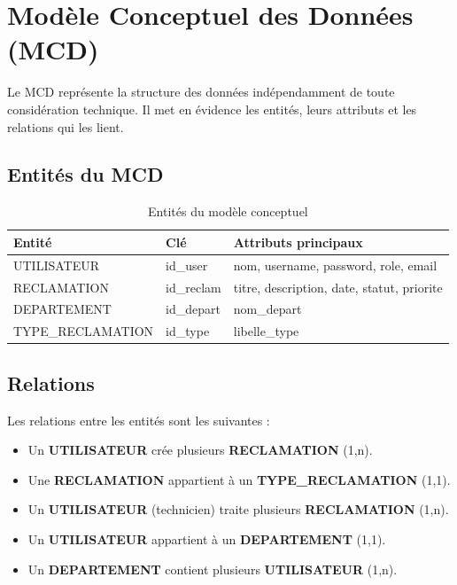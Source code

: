 \documentclass[12pt,a4paper,oneside]{report}
\renewcommand{\arraystretch}{1.3}
\begin{document}
\section{Modèle Conceptuel des Données (MCD)}

Le MCD représente la structure des données indépendamment de toute considération technique. Il met en évidence les entités, leurs attributs et les relations qui les lient.

\subsection{Entités du MCD}

\begin{table}[htbp]
    \centering
    \caption{Entités du modèle conceptuel}
    \label{tab:entites-mcd}
    \renewcommand{\arraystretch}{1.5}
    \begin{tabular}{p{3cm} p{3cm} p{6cm}}
        \toprule
        \textbf{Entité} & \textbf{Clé} & \textbf{Attributs principaux} \\
        \midrule
        UTILISATEUR & id\_user & nom, username, password, role, email \\
        RECLAMATION & id\_reclam & titre, description, date, statut, priorite \\
        DEPARTEMENT & id\_depart & nom\_depart \\
        TYPE\_RECLAMATION & id\_type & libelle\_type \\
        \bottomrule
    \end{tabular}
\end{table}

\subsection{Relations}

Les relations entre les entités sont les suivantes :
\begin{itemize}
    \item Un \textbf{UTILISATEUR} crée plusieurs \textbf{RECLAMATION} (1,n).
    \item Une \textbf{RECLAMATION} appartient à un \textbf{TYPE\_RECLAMATION} (1,1).
    \item Un \textbf{UTILISATEUR} (technicien) traite plusieurs \textbf{RECLAMATION} (1,n).
    \item Un \textbf{UTILISATEUR} appartient à un \textbf{DEPARTEMENT} (1,1).
    \item Un \textbf{DEPARTEMENT} contient plusieurs \textbf{UTILISATEUR} (1,n).
\end{itemize}
\end{document}
